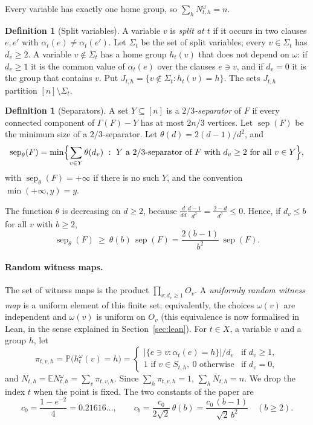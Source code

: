 \documentclass[11pt,a4paper]{article}
\theoremstyle{definition}
\newtheorem{definition}[theorem]{Definition}
\theoremstyle{remark}
\newcommand{\E}{\mathbb{E}}
\newcommand{\PP}{\mathbb{P}}
\newcommand{\sep}{\operatorname{sep}}
\newcommand{\sepw}{\operatorname{sep}_{\theta}}
\newcommand{\Gr}{\Gamma}
\newcommand{\Nbar}{\overline{N}}
\begin{document}
Every variable has exactly one home group, so $\sum_hN^\omega_{t,h}=n$.

\begin{definition}[Split variables]\label{def:split}
A variable $v$ is \emph{split at $t$} if it occurs in two clauses $e,e'$ with
$\alpha_t(e)\ne\alpha_t(e')$. Let $\Sigma_t$ be the set of split variables; every
$v\in\Sigma_t$ has $d_v\ge2$. A variable $v\notin\Sigma_t$ has a home group $h_t(v)$ that
does not depend on $\omega$: if $d_v\ge1$ it is the common value of $\alpha_t(e)$ over the
clauses $e\ni v$, and if $d_v=0$ it is the group that contains $v$. Put
$J_{t,h}=\{v\notin\Sigma_t:h_t(v)=h\}$. The sets $J_{t,h}$ partition $[n]\setminus\Sigma_t$.
\end{definition}

\begin{definition}[Separators]\label{def:sep}
A set $Y\subseteq[n]$ is a \emph{$2/3$-separator} of $F$ if every connected component of
$\Gr(F)-Y$ has at most $2n/3$ vertices. Let $\sep(F)$ be the minimum size of a
$2/3$-separator. Let $\theta(d)=2(d-1)/d^2$, and
\[
\sepw(F)=\min\Bigl\{\sum_{v\in Y}\theta(d_v)\ :\ Y\text{ a }2/3\text{-separator of }F
\text{ with }d_v\ge2\text{ for all }v\in Y\Bigr\},
\]
with $\sepw(F)=+\infty$ if there is no such $Y$, and the convention $\min(+\infty,y)=y$.
\end{definition}

The function $\theta$ is decreasing on $d\ge2$, because
$\frac{d}{dd}\frac{d-1}{d^2}=\frac{2-d}{d^3}\le0$. Hence, if $d_v\le b$ for all $v$ with
$b\ge2$,
\begin{equation}\label{eq:sepw}
\sepw(F)\ \ge\ \theta(b)\,\sep(F)=\frac{2(b-1)}{b^2}\,\sep(F).
\end{equation}

\paragraph{Random witness maps.} The set of witness maps is the product
$\prod_{v:d_v\ge1}O_v$. A \emph{uniformly random witness map} is a uniform element of this
finite set; equivalently, the choices $\omega(v)$ are independent and $\omega(v)$ is uniform
on $O_v$ (this equivalence is now formalised in Lean, in the sense explained in
Section~\ref{sec:lean}). For $t\in X$, a variable $v$ and a group $h$, let
\[
\pi_{t,v,h}=\PP\bigl(h^\omega_t(v)=h\bigr)=
\begin{cases}
|\{e\ni v:\alpha_t(e)=h\}|/d_v&\text{if }d_v\ge1,\\
1\text{ if }v\in S_{t,h},\ 0\text{ otherwise}&\text{if }d_v=0,
\end{cases}
\]
and $\Nbar_{t,h}=\E N^\omega_{t,h}=\sum_v\pi_{t,v,h}$. Since $\sum_h\pi_{t,v,h}=1$,
$\sum_h\Nbar_{t,h}=n$. We drop the index $t$ when the point is fixed. The two constants of
the paper are
\[
c_0=\frac{1-e^{-2}}{4}=0.21616\ldots,\qquad
c_b=\frac{c_0}{2\sqrt2}\,\theta(b)=\frac{c_0\,(b-1)}{\sqrt2\,b^2}\quad(b\ge2).
\]
\end{document}
